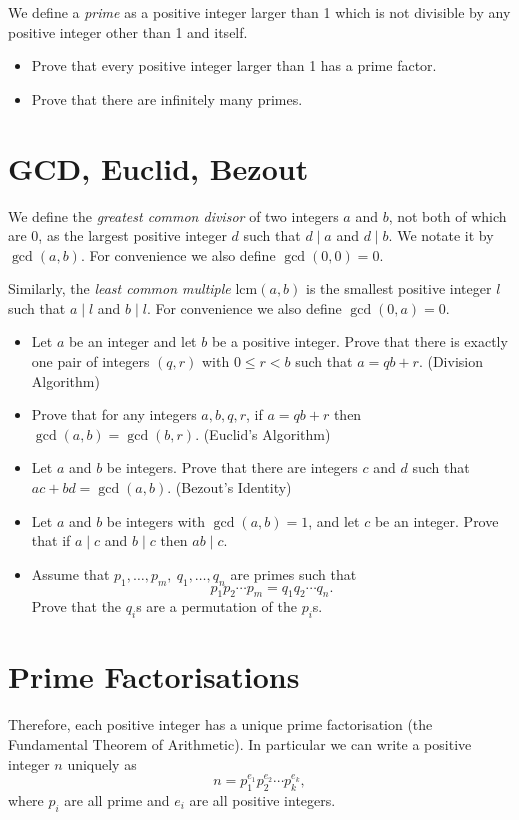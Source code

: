 \documentclass{article}
\begin{document}
  We define a \emph{prime} as a positive integer larger than 1 which is not
  divisible by any positive integer other than 1 and itself.
  \begin{itemize}
    \item Prove that every positive integer larger than 1 has a prime factor.
    \item Prove that there are infinitely many primes.
  \end{itemize}
\section{GCD, Euclid, Bezout}
  We define the \emph{greatest common divisor} of two integers $a$ and $b$, not
  both of which are 0, as the largest positive integer $d$ such that $d\mid a$
  and $d\mid b$. We notate it by $\gcd(a,b)$. For convenience we also define
  $\gcd(0,0)=0$.

  Similarly, the \emph{least common multiple} $\mathrm{lcm}(a,b)$ is the
  smallest positive integer $l$ such that $a\mid l$ and $b\mid l$. For
  convenience we also define $\gcd(0,a)=0$.
  \begin{itemize}
    \item Let $a$ be an integer and let $b$ be a positive integer. Prove that
      there is exactly one pair of integers $(q,r)$ with $0\le r<b$ such that
      $a=qb+r$. (Division Algorithm)
    \item Prove that for any integers $a,b,q,r$, if $a=qb+r$ then
      $\gcd(a,b)=\gcd(b,r)$. (Euclid's Algorithm)
    \item Let $a$ and $b$ be integers. Prove that there are integers $c$ and $d$
      such that $ac+bd=\gcd(a,b)$. (Bezout's Identity)
    \item Let $a$ and $b$ be integers with $\gcd(a,b)=1$, and let $c$ be an
      integer. Prove that if $a\mid c$ and $b\mid c$ then $ab\mid c$.
    \item Assume that $p_1,\ldots,p_m,\ q_1,\ldots,q_n$ are primes such that
      \[p_1p_2\cdots p_m=q_1q_2\cdots q_n.\]
      Prove that the $q_i$s are a permutation of the $p_i$s.
  \end{itemize}
\section{Prime Factorisations}
  Therefore, each positive integer has a unique prime factorisation (the
  Fundamental Theorem of Arithmetic).
  In particular we can write a positive integer $n$ uniquely as
  \[n=p_1^{e_1}p_2^{e_2}\cdots p_k^{e_k},\]
  where $p_i$ are all prime and $e_i$ are all positive integers.
\end{document}
